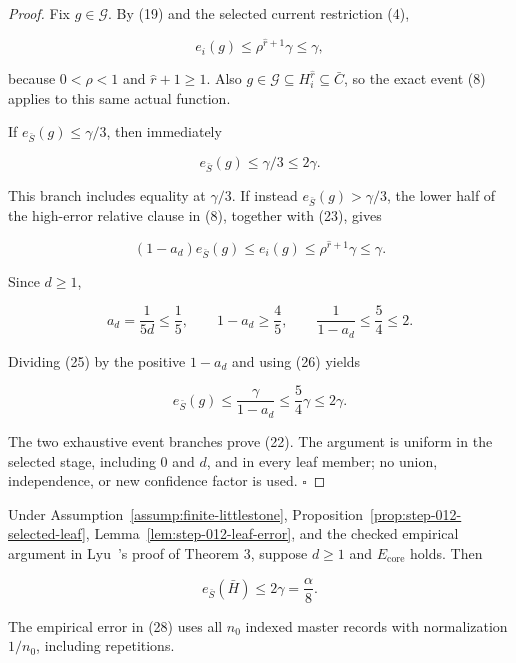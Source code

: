 \begin{proof}
Fix \(g\in\mathcal G\). By (19) and the selected current
restriction (4),

\[
 e_i(g)\le\rho^{\widehat r+1}\gamma\le\gamma,
\tag{23}
\]

because \(0<\rho<1\) and \(\widehat r+1\ge1\). Also
\(g\in\mathcal G\subseteq H_i^{\widehat r}\subseteq\bar C\), so the exact
event (8) applies to this same actual function.

If \(e_{\bar S}(g)\le\gamma/3\), then immediately

\[
 e_{\bar S}(g)\le\gamma/3\le2\gamma.
\tag{24}
\]

This branch includes equality at \(\gamma/3\). If instead
\(e_{\bar S}(g)>\gamma/3\), the lower half of the high-error relative
clause in (8), together with (23), gives

\[
 (1-a_d)e_{\bar S}(g)
 \le e_i(g)
 \le\rho^{\widehat r+1}\gamma
 \le\gamma.
\tag{25}
\]

Since \(d\ge1\),

\[
 a_d=\frac1{5d}\le\frac15,
 \qquad
 1-a_d\ge\frac45,
 \qquad
 \frac1{1-a_d}\le\frac54\le2.
\tag{26}
\]

Dividing (25) by the positive \(1-a_d\) and using (26) yields

\[
 e_{\bar S}(g)
 \le\frac{\gamma}{1-a_d}
 \le\frac54\gamma
 \le2\gamma.
\tag{27}
\]

The two exhaustive event branches prove (22). The argument is uniform in
the selected stage, including \(0\) and \(d\), and in every leaf member;
no union, independence, or new confidence factor is used. \(\square\)


\end{proof}

\begin{lemma}\label{lem:step-012-empirical}
Under Assumption~\ref{assump:finite-littlestone},
Proposition~\ref{prop:step-012-selected-leaf},
Lemma~\ref{lem:step-012-leaf-error}, and the checked empirical argument in
Lyu~\citep{lyu2025}'s proof of Theorem 3, suppose \(d\ge1\) and
\(E_{\mathrm{core}}\) holds. Then

\[
 e_{\bar S}(\bar H)\le2\gamma=\frac{\alpha}{8}.
\tag{28}
\]

The empirical error in (28) uses all \(n_0\) indexed master records with
normalization \(1/n_0\), including repetitions.


\end{lemma}

